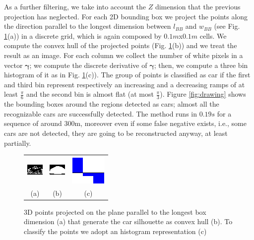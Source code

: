 As a further filtering, we take into account the $Z$ dimension that the previous projection has neglected.
For each 2D bounding box we project the points along the direction parallel to the longest dimension between $l_{BB}$ and $w_{BB}$ (see Fig. \ref{fig:convHull}(a)) in a discrete grid, which is again composed by $0.1m$x$0.1m$ cells.
We compute the convex hull of the projected points (Fig. \ref{fig:convHull}(b)) and we treat the result as an image. 
For each column we collect the number of white pixels in a vector $\mathbf{\gamma}$; we compute the discrete derivative of $\mathbf{\gamma}$; then, we compute a three bin histogram of it as in Fig. \ref{fig:convHull}(c)).
The group of points is classified as car if the first and third bin represent respectively an increasing and a decreasing ramps of at least $\frac{\pi}{6}$ and the second bin is almost flat (at most $\frac{\pi}{3}$). 
Figure \ref{fig:drawing} shows the bounding boxes around the regions detected as cars; almost all the recognizable cars are successfully detected.
The method runs in $0.19s$ for a sequence of around $300$m, moreover even if some false negative exists, i.e., some cars are not detected, they are going to be reconstructed anyway, at least partially.


\begin{figure}[tp]
    \centering
    \begin{tabular}{ccc}
        \includegraphics[width=0.3\columnwidth]{./img/ch-laser/CurProj.png}&
        \includegraphics[width=0.3\columnwidth]{./img/ch-laser/convHull.png}&
        \includegraphics[width=0.3\columnwidth]{./img/ch-laser/hist}\\
        (a)&(b)&(c)
    \end{tabular}
    \caption{3D points projected on the plane parallel to the longest box dimension (a) that generate the car silhouette as convex hull (b). To classify the points we adopt an histogram representation (c)}
    \label{fig:convHull}
\end{figure}

